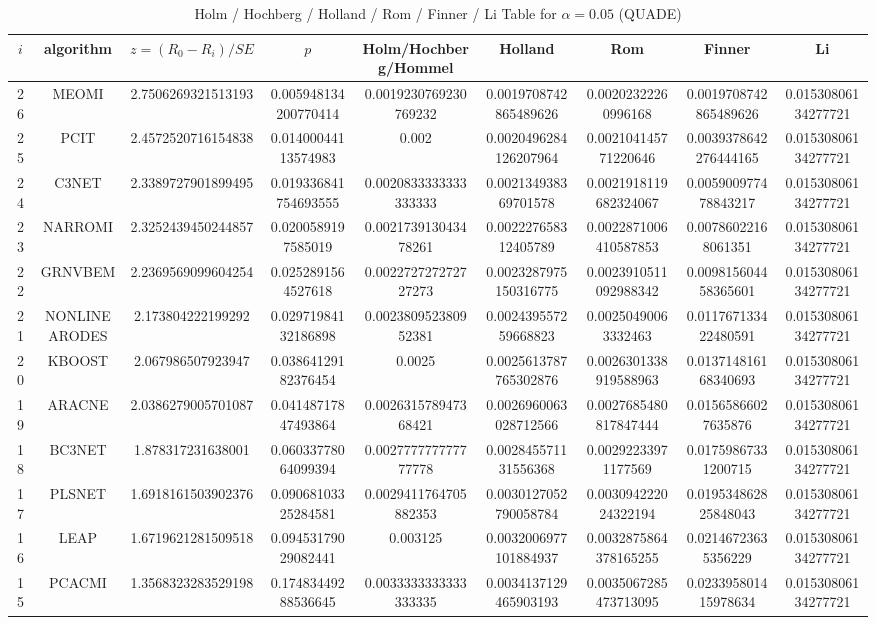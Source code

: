 \documentclass[a4paper,10pt]{article}
\begin{document}
\begin{landscape}
\begin{table}[!htp]
\centering\scriptsize
\caption{Holm / Hochberg / Holland / Rom / Finner / Li Table for $\alpha=0.05$ (QUADE)}
\begin{tabular}{ccccccccc}
$i$&algorithm&$z=(R_0 - R_i)/SE$&$p$&Holm/Hochberg/Hommel&Holland&Rom&Finner&Li\\
\hline
26&MEOMI&2.7506269321513193&0.005948134200770414&0.0019230769230769232&0.0019708742865489626&0.00202322260996168&0.0019708742865489626&0.01530806134277721\\
25&PCIT&2.4572520716154838&0.01400044113574983&0.002&0.0020496284126207964&0.002104145771220646&0.0039378642276444165&0.01530806134277721\\
24&C3NET&2.3389727901899495&0.019336841754693555&0.0020833333333333333&0.002134938369701578&0.0021918119682324067&0.005900977478843217&0.01530806134277721\\
23&NARROMI&2.3252439450244857&0.0200589197585019&0.002173913043478261&0.002227658312405789&0.0022871006410587853&0.00786022168061351&0.01530806134277721\\
22&GRNVBEM&2.2369569099604254&0.0252891564527618&0.002272727272727273&0.0023287975150316775&0.0023910511092988342&0.009815604458365601&0.01530806134277721\\
21&NONLINEARODES&2.173804222199292&0.02971984132186898&0.002380952380952381&0.002439557259668823&0.00250490063332463&0.011767133422480591&0.01530806134277721\\
20&KBOOST&2.067986507923947&0.03864129182376454&0.0025&0.0025613787765302876&0.0026301338919588963&0.013714816168340693&0.01530806134277721\\
19&ARACNE&2.0386279005701087&0.04148717847493864&0.002631578947368421&0.0026960063028712566&0.0027685480817847444&0.01565866027635876&0.01530806134277721\\
18&BC3NET&1.878317231638001&0.06033778064099394&0.002777777777777778&0.002845571131556368&0.00292233971177569&0.01759867331200715&0.01530806134277721\\
17&PLSNET&1.6918161503902376&0.09068103325284581&0.0029411764705882353&0.0030127052790058784&0.003094222024322194&0.019534862825848043&0.01530806134277721\\
16&LEAP&1.6719621281509518&0.09453179029082441&0.003125&0.0032006977101884937&0.0032875864378165255&0.02146723635356229&0.01530806134277721\\
15&PCACMI&1.3568323283529198&0.17483449288536645&0.0033333333333333335&0.0034137129465903193&0.0035067285473713095&0.023395801415978634&0.01530806134277721\\

\end{tabular}
\end{table}
\end{landscape}
\end{document}

